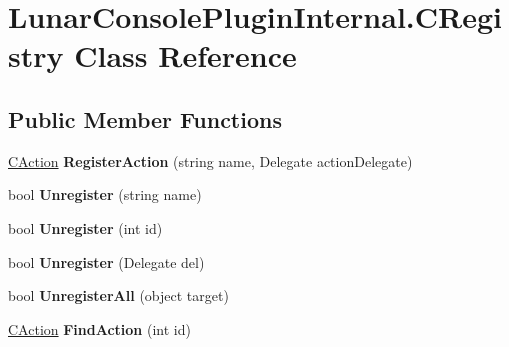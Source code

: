 \hypertarget{class_lunar_console_plugin_internal_1_1_c_registry}{}\section{Lunar\+Console\+Plugin\+Internal.\+C\+Registry Class Reference}
\label{class_lunar_console_plugin_internal_1_1_c_registry}
\subsection*{Public Member Functions}
\begin{DoxyCompactItemize}
\item 
\mbox{\label{class_lunar_console_plugin_internal_1_1_c_registry_ad78860bed2331a3f1fed17fed7f6881e}} 
\mbox{\hyperlink{class_lunar_console_plugin_internal_1_1_c_action}{C\+Action}} {\bfseries Register\+Action} (string name, Delegate action\+Delegate)
\item 
\mbox{\label{class_lunar_console_plugin_internal_1_1_c_registry_ab6fbaf34092243050b55351db4c3d42b}} 
bool {\bfseries Unregister} (string name)
\item 
\mbox{\label{class_lunar_console_plugin_internal_1_1_c_registry_a23636b6ada2c7e30f9969c8fb3be817a}} 
bool {\bfseries Unregister} (int id)
\item 
\mbox{\label{class_lunar_console_plugin_internal_1_1_c_registry_a4b8aff10a48b1538b2a661d354ead9eb}} 
bool {\bfseries Unregister} (Delegate del)
\item 
\mbox{\label{class_lunar_console_plugin_internal_1_1_c_registry_a28e0e7eac8299f725ee0892815c19b1b}} 
bool {\bfseries Unregister\+All} (object target)
\item 
\mbox{\label{class_lunar_console_plugin_internal_1_1_c_registry_a38ba39908ed83d1d3fdae883f309bcee}} 
\mbox{\hyperlink{class_lunar_console_plugin_internal_1_1_c_action}{C\+Action}} {\bfseries Find\+Action} (int id)

\end{DoxyCompactItemize}
